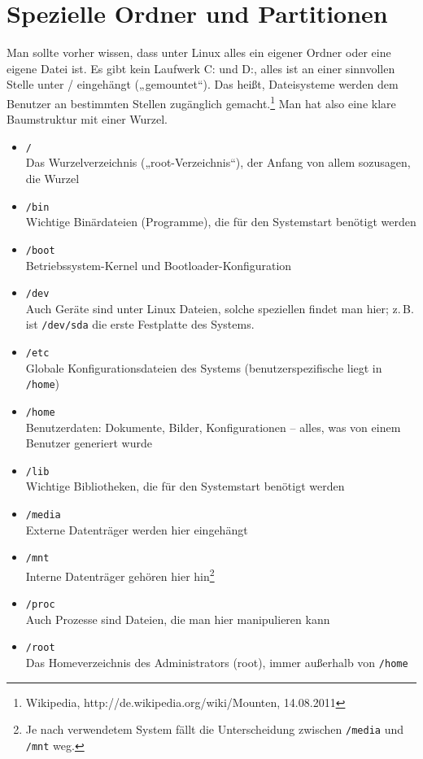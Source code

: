 \documentclass[a4paper,12pt]{article}
\begin{document}
\section{Spezielle Ordner und Partitionen}
Man sollte vorher wissen, dass unter Linux alles ein eigener Ordner oder 
eine eigene Datei ist. Es gibt kein Laufwerk C: und D:, alles ist 
an einer sinnvollen Stelle unter / eingehängt („gemountet“). Das heißt, 
Dateisysteme werden dem Benutzer an bestimmten Stellen zugänglich gemacht.\footnote{Wikipedia, http://de.wikipedia.org/wiki/Mounten, 14.08.2011}
Man hat also eine klare Baumstruktur mit einer Wurzel.
\begin{itemize}
\item \texttt{/} \\ Das Wurzelverzeichnis („root-Verzeichnis“), der Anfang von allem sozusagen, die Wurzel
\item \texttt{/bin} \\ Wichtige Binärdateien (Programme), die für den Systemstart benötigt werden
\item \texttt{/boot} \\ Betriebssystem-Kernel und Bootloader-Konfiguration
\item \texttt{/dev} \\ Auch Geräte sind unter Linux Dateien, solche 
speziellen findet man hier; z.\,B. ist \texttt{/dev/sda} die erste Festplatte des Systems.
\item \texttt{/etc} \\ Globale Konfigurationsdateien des Systems (benutzerspezifische liegt in \texttt{/home})
\item \texttt{/home} \\ Benutzerdaten: Dokumente, Bilder, Konfigurationen -- alles, was von einem Benutzer generiert wurde
\item \texttt{/lib} \\ Wichtige Bibliotheken, die für den Systemstart benötigt werden
\item \texttt{/media} \\ Externe Datenträger werden hier eingehängt
\item \texttt{/mnt} \\ Interne Datenträger gehören hier hin\footnote{Je nach verwendetem System fällt die Unterscheidung zwischen \texttt{/media} und \texttt{/mnt} weg.}
\item \texttt{/proc} \\ Auch Prozesse sind Dateien, die man hier manipulieren kann
\item \texttt{/root} \\ Das Homeverzeichnis des Administrators (root), immer außerhalb von \texttt{/home}

\end{itemize}
\end{document}
